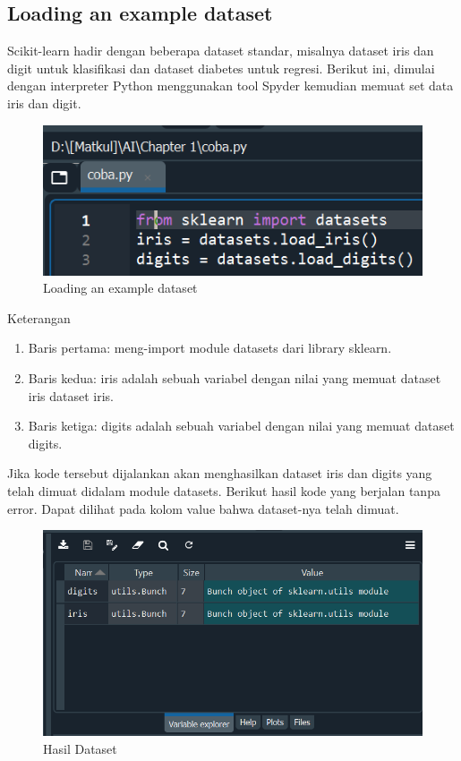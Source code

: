 \subsection{Loading an example dataset}

\par Scikit-learn hadir dengan beberapa dataset standar, misalnya dataset iris dan digit untuk klasifikasi dan dataset diabetes untuk regresi. Berikut ini, dimulai dengan interpreter Python menggunakan tool Spyder kemudian memuat set data iris dan digit.\cite{scikit}
    \begin{figure}[H]
    \centering
    \includegraphics[width=12cm]{figures/1184023/2.PNG}
    \caption{Loading an example dataset}
    \end{figure}

\par Keterangan
    \begin{enumerate}
        \item Baris pertama: meng-import module datasets dari library sklearn.
        \item Baris kedua: iris adalah sebuah variabel dengan nilai yang memuat dataset iris dataset iris.
        \item Baris ketiga: digits adalah sebuah variabel dengan nilai yang memuat dataset digits.
    \end{enumerate}

\par Jika kode tersebut dijalankan akan menghasilkan dataset iris dan digits yang telah dimuat didalam module datasets. Berikut hasil kode yang berjalan tanpa error. Dapat dilihat pada kolom value bahwa dataset-nya telah dimuat.
    \begin{figure}[H]
    \centering
    \includegraphics[width=12cm]{figures/1184023/3.PNG}
    \caption{Hasil Dataset}
    \end{figure}

